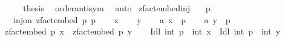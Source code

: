 \begin{isabellebody}
\isanewline
\ \ \isamarkupfalse%
\ \isamarkupfalse%
\ {\isacharquery}{\kern0pt}thesis\ \isamarkupfalse%
\ order{\isacharunderscore}{\kern0pt}antisym\ \isamarkupfalse%
\ auto\isanewline
{}\isamarkupfalse%
%
\endisatagproof
{\isafoldproof}%
%
\isadelimproof
\isanewline
%
\endisadelimproof
\isanewline
{}\isamarkupfalse%
\ zfact{\isacharunderscore}{\kern0pt}embed{\isacharunderscore}{\kern0pt}inj{\isacharcolon}{\kern0pt}\isanewline
\ \ \ {\isachardoublequoteopen}p\ {\isachargreater}{\kern0pt}\ {}{\isachardoublequoteclose}\isanewline
\ \ \ {\isachardoublequoteopen}inj{\isacharunderscore}{\kern0pt}on\ {\isacharparenleft}{\kern0pt}zfact{\isacharunderscore}{\kern0pt}embed\ p{\isacharparenright}{\kern0pt}\ {\isacharbraceleft}{\kern0pt}{}{\isachardot}{\kern0pt}{\isachardot}{\kern0pt}{\isacharless}{\kern0pt}p{\isacharbraceright}{\kern0pt}{\isachardoublequoteclose}\isanewline
%
\isadelimproof
%
\endisadelimproof
%
\isatagproof
{}\isamarkupfalse%
\isanewline
\ \ \isamarkupfalse%
\ x\isanewline
\ \ \isamarkupfalse%
\ y\isanewline
\ \ \isamarkupfalse%
\ a{}{\isacharcolon}{\kern0pt}\ {\isachardoublequoteopen}x\ {\isasymin}\ {\isacharbraceleft}{\kern0pt}{}{\isachardot}{\kern0pt}{\isachardot}{\kern0pt}{\isacharless}{\kern0pt}p{\isacharbraceright}{\kern0pt}{\isachardoublequoteclose}\isanewline
\ \ \isamarkupfalse%
\ a{}{\isacharcolon}{\kern0pt}\ {\isachardoublequoteopen}y\ {\isasymin}\ {\isacharbraceleft}{\kern0pt}{}{\isachardot}{\kern0pt}{\isachardot}{\kern0pt}{\isacharless}{\kern0pt}p{\isacharbraceright}{\kern0pt}{\isachardoublequoteclose}\isanewline
\ \ \isamarkupfalse%
\ {\isachardoublequoteopen}zfact{\isacharunderscore}{\kern0pt}embed\ p\ x\ {\isacharequal}{\kern0pt}\ zfact{\isacharunderscore}{\kern0pt}embed\ p\ y{\isachardoublequoteclose}\isanewline
\ \ \isamarkupfalse%
\ {\isachardoublequoteopen}Idl\isactrlbsub {\isasymZ}\isactrlesub \ {\isacharbraceleft}{\kern0pt}int\ p{\isacharbraceright}{\kern0pt}\ {\isacharplus}{\kern0pt}{\isachargreater}{\kern0pt}\isactrlbsub {\isasymZ}\isactrlesub \ int\ x\ {\isacharequal}{\kern0pt}\ Idl\isactrlbsub {\isasymZ}\isactrlesub \ {\isacharbraceleft}{\kern0pt}int\ p{\isacharbraceright}{\kern0pt}\ {\isacharplus}{\kern0pt}{\isachargreater}{\kern0pt}\isactrlbsub {\isasymZ}\isactrlesub \ int\ y{\isachardoublequoteclose}\isanewline

\end{isabellebody}
